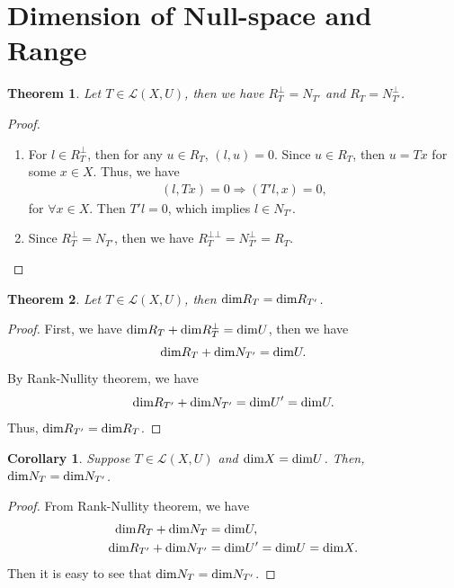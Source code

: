 \documentclass[10pt]{book}
\newtheorem{theorem}{Theorem}[chapter]
\newtheorem{corollary}{Corollary}[theorem]
\theoremstyle{definition}
\numberwithin{equation}{chapter}
\begin{document}
\section{Dimension of Null-space and Range}
\begin{theorem}\label{theorem_371}
Let $T\in \mathscr{L}(X,U)$, then we have $R_T^\bot = N_{T'}$ and $R_T = N_{T'}^\bot$.
\end{theorem}
\begin{proof}
~\begin{enumerate}[label=(\alph*)]
    \item For $l\in R_T^\bot$, then for any $u\in R_T$, $(l,u) = 0$. Since $u\in R_T$, then $u = T x$ for some $x\in X$. Thus, we have
    \begin{align*}
        (l, T x) = 0 \Rightarrow (T' l, x) = 0,
    \end{align*}
    for $\forall x\in X$. Then $T' l = 0$, which implies $l\in N_{T'}$.
    \item Since $R_T^\bot = N_{T'}$, then we have $R_T^{\bot\bot} = N_{T'}^\bot = R_T$.
\end{enumerate}
\end{proof}

\medskip

\begin{theorem}
Let $T\in \mathscr{L}(X,U)$, then ${\rm dim}R_T = {\rm dim}R_{T'}$.
\end{theorem}
\begin{proof}
First, we have ${\rm dim}R_T + {\rm dim}R_T^\bot = {\rm dim}U$, then we have $${\rm dim}R_T + {\rm dim}N_{T'} = {\rm dim}U.$$
By Rank-Nullity theorem, we have $${\rm dim}R_{T'} + {\rm dim}N_{T'} = {\rm dim}U' = {\rm dim}U.$$ 
Thus, ${\rm dim}R_{T'} = {\rm dim}R_{T}$.
\end{proof}

\medskip

\begin{corollary}
Suppose $T\in \mathscr{L}(X,U)$ and ${\rm dim} X = {\rm dim} U$. Then, ${\rm dim}N_T = {\rm dim}N_{T'}$.
\end{corollary}
\begin{proof}
From Rank-Nullity theorem, we have 
\begin{align*}
    {\rm dim}R_T + {\rm dim}N_T & = {\rm dim}U, \\
    {\rm dim}R_{T'} + {\rm dim}N_{T'} & = {\rm dim}U' = {\rm dim}U = {\rm dim}X.
\end{align*}
Then it is easy to see that ${\rm dim}N_T = {\rm dim}N_{T'}$.
\end{proof}
\end{document}
